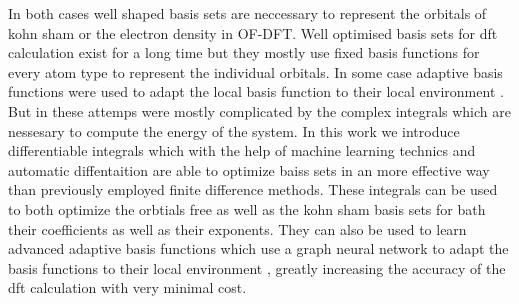 In both cases well shaped basis sets are neccessary to represent the orbitals of kohn sham or the electron density in OF-DFT. Well optimised basis sets for dft calculation exist for a long time \cite{something} but they mostly use fixed basis functions for every atom type to represent the individual orbitals. In some case adaptive basis functions were used to adapt the local basis function to their local environment \cite{something}. But in these  attemps were mostly complicated by the complex integrals which are nessesary to compute the energy of the system. In this work we introduce differentiable integrals which with the help of machine learning technics and automatic diffentaition are  able to optimize baiss sets in an more effective way than previously employed finite difference methods. These integrals can be used to both optimize the orbtials free as well as the kohn sham basis sets for bath their coefficients as well as their exponents. They can also be used to learn advanced adaptive basis functions which use a graph neural network to adapt the basis functions to their local environment , greatly increasing the accuracy of the dft calculation with very minimal cost.

